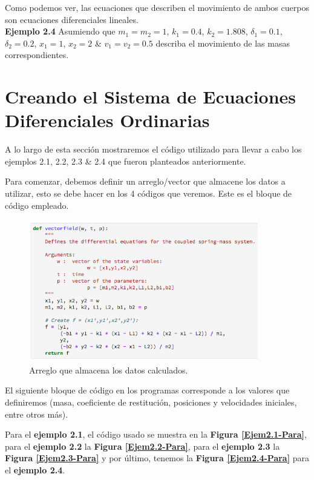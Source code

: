 Como podemos ver, las ecuaciones que describen el movimiento de ambos cuerpos son ecuaciones diferenciales lineales. \\

\textbf{Ejemplo 2.4} Asumiendo que $m_1=m_2=1$, $k_1=0.4$, $k_2=1.808$, $\delta_1=0.1$, $\delta_2=0.2$, $x_1=1$, $x_2=2$ \& $v_1=v_2=0.5$ describa el movimiento de las masas correspondientes.

\section{Creando el Sistema de Ecuaciones Diferenciales Ordinarias}

A lo largo de esta sección mostraremos el código utilizado para llevar a cabo los ejemplos 2.1, 2.2, 2.3 \& 2.4 que fueron planteados anteriormente.

Para comenzar, debemos definir un arreglo/vector que almacene los datos a utilizar, esto se debe hacer en los 4 códigos que veremos. Este es el bloque de código empleado.

\begin{figure}[h!]
	\begin{center}
		\includegraphics[width=10cm]{Ejem-Vec}
    	\caption{Arreglo que almacena los datos calculados.}
	\end{center}
\end{figure}

El siguiente bloque de código en los programas corresponde a los valores que definiremos (masa, coeficiente de restitución, posiciones y velocidades iniciales, entre otros más).

Para el \textbf{ejemplo 2.1}, el código usado se muestra en la \textbf{Figura \ref{Ejem2.1-Para}}, para el \textbf{ejemplo 2.2} la \textbf{Figura \ref{Ejem2.2-Para}}, para el \textbf{ejemplo 2.3} la \textbf{Figura \ref{Ejem2.3-Para}} y por último, tenemos la \textbf{Figura \ref{Ejem2.4-Para}} para el \textbf{ejemplo 2.4}.

